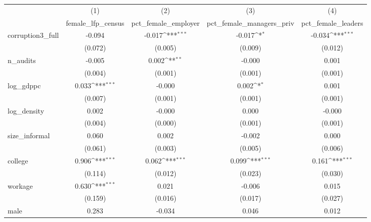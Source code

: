 {
\def\sym#1{\ifmmode^{#1}\else\(^{#1}\)\fi}
\begin{tabular}{l*{4}{c}}
\hline\hline
            &\multicolumn{1}{c}{(1)}&\multicolumn{1}{c}{(2)}&\multicolumn{1}{c}{(3)}&\multicolumn{1}{c}{(4)}\\
            &\multicolumn{1}{c}{female\_lfp\_census}&\multicolumn{1}{c}{pct\_female\_employer}&\multicolumn{1}{c}{pct\_female\_managers\_priv}&\multicolumn{1}{c}{pct\_female\_leaders}\\
\hline
corruption3\_full&      -0.094         &      -0.017\sym{***}&      -0.017\sym{*}  &      -0.034\sym{***}\\
            &     (0.072)         &     (0.005)         &     (0.009)         &     (0.012)         \\
[1em]
n\_audits    &      -0.005         &       0.002\sym{**} &      -0.000         &       0.001         \\
            &     (0.004)         &     (0.001)         &     (0.001)         &     (0.001)         \\
[1em]
log\_gdppc   &       0.033\sym{***}&      -0.000         &       0.002\sym{*}  &       0.001         \\
            &     (0.007)         &     (0.001)         &     (0.001)         &     (0.001)         \\
[1em]
log\_density &       0.002         &      -0.000         &       0.000         &      -0.000         \\
            &     (0.004)         &     (0.000)         &     (0.001)         &     (0.001)         \\
[1em]
size\_informal&       0.060         &       0.002         &      -0.002         &       0.000         \\
            &     (0.061)         &     (0.003)         &     (0.005)         &     (0.006)         \\
[1em]
college     &       0.906\sym{***}&       0.062\sym{***}&       0.099\sym{***}&       0.161\sym{***}\\
            &     (0.114)         &     (0.012)         &     (0.023)         &     (0.030)         \\
[1em]
workage     &       0.630\sym{***}&       0.021         &      -0.006         &       0.015         \\
            &     (0.159)         &     (0.016)         &     (0.017)         &     (0.027)         \\
[1em]
male        &       0.283         &      -0.034         &       0.046         &       0.012         \\

\end{tabular}}
